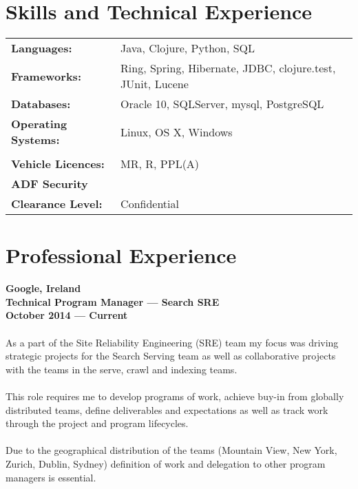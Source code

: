 \documentclass[a4paper]{article}
\begin{document}
\section*{Skills and Technical Experience}
\begin{tabular}{l l}
\textbf{Languages:} & Java, Clojure, Python, SQL\\
\textbf{Frameworks:} & Ring, Spring, Hibernate, JDBC, clojure.test, JUnit, Lucene\\
\textbf{Databases:} & Oracle 10, SQLServer, mysql, PostgreSQL\\
\textbf{Operating Systems:} & Linux, OS X, Windows\\\\
\textbf{Vehicle Licences:}&MR, R, PPL(A)\\
\textbf{ADF Security}&\\\textbf{Clearance Level:}&Confidential\\
\end{tabular}
\vspace{5pt}
\section*{Professional Experience}
\textbf{Google, Ireland\\Technical Program Manager --- Search SRE\\October 2014 --- Current}\\\\
As a part of the Site Reliability Engineering (SRE) team my focus was driving strategic projects for the Search Serving team as well as collaborative projects with the teams in the serve, crawl and indexing teams.
\\\\
This role requires me to develop programs of work, achieve buy-in from globally distributed teams, define deliverables and expectations as well as track work through the project and program lifecycles.
\\\\
Due to the geographical distribution of the teams (Mountain View, New York, Zurich, Dublin, Sydney) definition of work and delegation to other program managers is essential.
\end{document}
